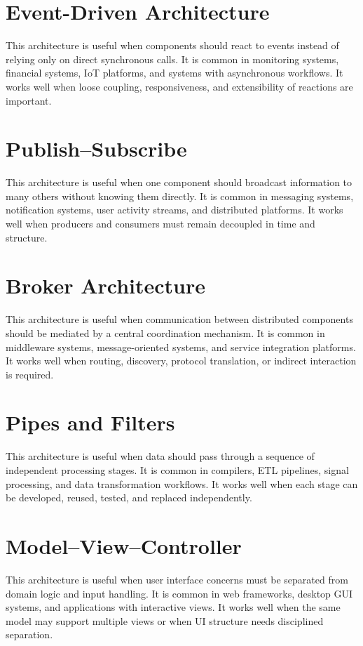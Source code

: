 \documentclass[a4paper]{article}
\begin{document}
    
    \section{Event-Driven Architecture}
        This architecture is useful when components should react to events instead of relying only on direct synchronous calls.
        It is common in monitoring systems, financial systems, IoT platforms, and systems with asynchronous workflows.
        It works well when loose coupling, responsiveness, and extensibility of reactions are important.
    
    
    \section{Publish--Subscribe}
        This architecture is useful when one component should broadcast information to many others without knowing them directly.
        It is common in messaging systems, notification systems, user activity streams, and distributed platforms.
        It works well when producers and consumers must remain decoupled in time and structure.
    
    
    \section{Broker Architecture}
        This architecture is useful when communication between distributed components should be mediated by a central coordination mechanism.
        It is common in middleware systems, message-oriented systems, and service integration platforms.
        It works well when routing, discovery, protocol translation, or indirect interaction is required.
    
    
    \section{Pipes and Filters}
        This architecture is useful when data should pass through a sequence of independent processing stages.
        It is common in compilers, ETL pipelines, signal processing, and data transformation workflows.
        It works well when each stage can be developed, reused, tested, and replaced independently.
    
    
    \section{Model--View--Controller}
        This architecture is useful when user interface concerns must be separated from domain logic and input handling.
        It is common in web frameworks, desktop GUI systems, and applications with interactive views.
        It works well when the same model may support multiple views or when UI structure needs disciplined separation.
    
\end{document}
